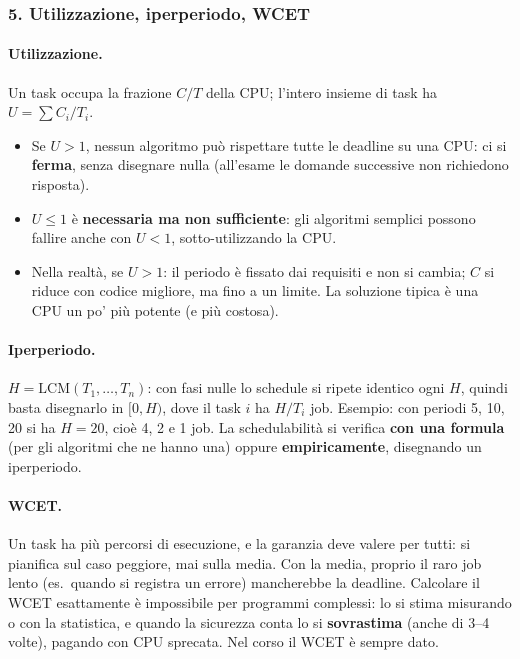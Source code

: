 \subsubsection*{5. Utilizzazione, iperperiodo, WCET}
\paragraph*{Utilizzazione.} Un task occupa la frazione $C/T$ della CPU; l'intero insieme di task ha $U = \sum C_i/T_i$.
\begin{itemize}
    \item Se $U > 1$, nessun algoritmo può rispettare tutte le deadline su una CPU: ci si \textbf{ferma}, senza disegnare nulla (all'esame le domande successive non richiedono risposta).
    \item $U \le 1$ è \textbf{necessaria ma non sufficiente}: gli algoritmi semplici possono fallire anche con $U < 1$, sotto-utilizzando la CPU.
    \item Nella realtà, se $U > 1$: il periodo è fissato dai requisiti e non si cambia; $C$ si riduce con codice migliore, ma fino a un limite. La soluzione tipica è una CPU un po' più potente (e più costosa).
\end{itemize}

\paragraph*{Iperperiodo.} $H = \mathrm{LCM}(T_1, \dots, T_n)$: con fasi nulle lo schedule si ripete identico ogni $H$, quindi basta disegnarlo in $[0, H)$, dove il task $i$ ha $H/T_i$ job. Esempio: con periodi 5, 10, 20 si ha $H = 20$, cioè 4, 2 e 1 job. La schedulabilità si verifica \textbf{con una formula} (per gli algoritmi che ne hanno una) oppure \textbf{empiricamente}, disegnando un iperperiodo.

\paragraph*{WCET.} Un task ha più percorsi di esecuzione, e la garanzia deve valere per tutti: si pianifica sul caso peggiore, mai sulla media. Con la media, proprio il raro job lento (es.\ quando si registra un errore) mancherebbe la deadline. Calcolare il WCET esattamente è impossibile per programmi complessi: lo si stima misurando o con la statistica, e quando la sicurezza conta lo si \textbf{sovrastima} (anche di 3--4 volte), pagando con CPU sprecata. Nel corso il WCET è sempre dato.

